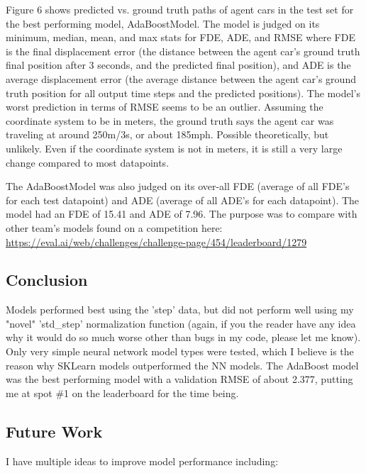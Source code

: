 \documentclass{article}
\begin{document}
Figure 6 shows predicted vs. ground truth paths of agent cars in the test set for the best performing model, AdaBoostModel. The model is judged on its minimum, median, mean, and max stats for FDE, ADE, and RMSE where FDE is the final displacement error (the distance between the agent car's ground truth final position after 3 seconds, and the predicted final position), and ADE is the average displacement error (the average distance between the agent car's ground truth position for all output time steps and the predicted positions). The model's worst prediction in terms of RMSE seems to be an outlier. Assuming the coordinate system to be in meters, the ground truth says the agent car was traveling at around 250m/3s, or about 185mph. Possible theoretically, but unlikely. Even if the coordinate system is not in meters, it is still a very large change compared to most datapoints.

The AdaBoostModel was also judged on its over-all FDE (average of all FDE's for each test datapoint) and ADE (average of all ADE's for each datapoint). The model had an FDE of 15.41 and ADE of 7.96. The purpose was to compare with other team's models found on a competition here: \url{https://eval.ai/web/challenges/challenge-page/454/leaderboard/1279}

\subsection{Conclusion}

Models performed best using the 'step' data, but did not perform well using my "novel" 'std\_step' normalization function (again, if you the reader have any idea why it would do so much worse other than bugs in my code, please let me know). Only very simple neural network model types were tested, which I believe is the reason why SKLearn models outperformed the NN models. The AdaBoost model was the best performing model with a validation RMSE of about 2.377, putting me at spot \#1 on the leaderboard for the time being.

\subsection{Future Work}

I have multiple ideas to improve model performance including:
\end{document}
